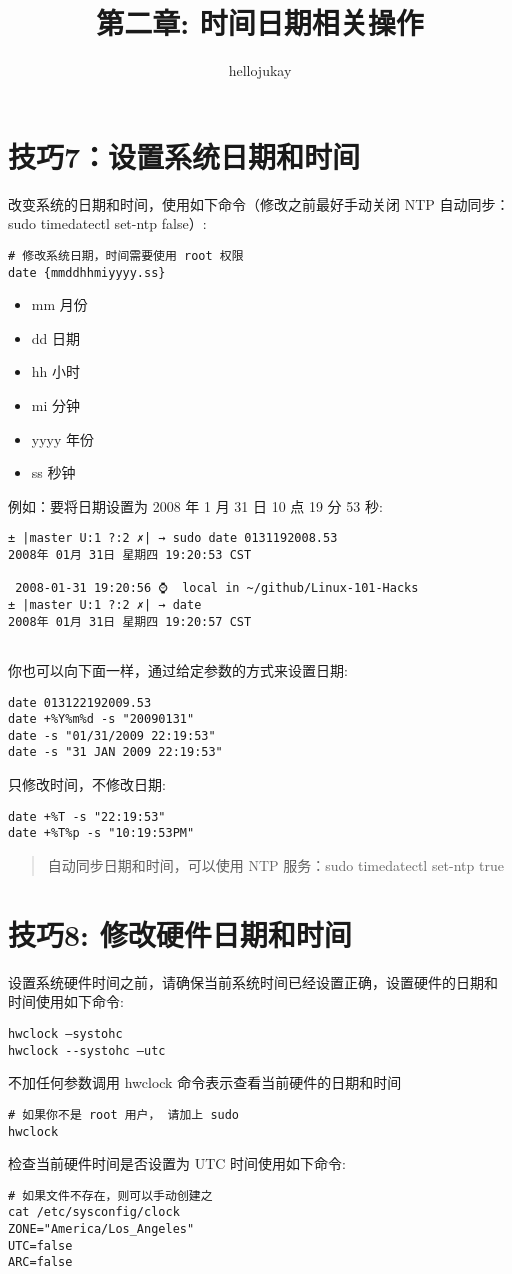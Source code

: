 \documentclass[UTF8]{ctexart}
\title{第二章: 时间日期相关操作}
\author{hellojukay}
\begin{document}
\section*{技巧7：设置系统日期和时间}

改变系统的日期和时间，使用如下命令（修改之前最好手动关闭 NTP 自动同步：sudo timedatectl set-ntp false）:
\begin{lstlisting}
# 修改系统日期，时间需要使用 root 权限
date {mmddhhmiyyyy.ss}
\end{lstlisting}
\begin{itemize}
    \item mm 月份
    \item dd 日期
    \item hh 小时
    \item mi 分钟
    \item yyyy 年份
    \item ss 秒钟
\end{itemize}
例如：要将日期设置为 2008 年 1 月 31 日 10 点
19 分 53 秒:
\begin{lstlisting}
± |master U:1 ?:2 ✗| → sudo date 0131192008.53                                                                                                                               
2008年 01月 31日 星期四 19:20:53 CST

 2008-01-31 19:20:56 ⌚  local in ~/github/Linux-101-Hacks
± |master U:1 ?:2 ✗| → date
2008年 01月 31日 星期四 19:20:57 CST
    
\end{lstlisting}
你也可以向下面一样，通过给定参数的方式来设置日期:
\begin{lstlisting}
date 013122192009.53
date +%Y%m%d -s "20090131"
date -s "01/31/2009 22:19:53"
date -s "31 JAN 2009 22:19:53"
\end{lstlisting}
只修改时间，不修改日期:
\begin{lstlisting}
date +%T -s "22:19:53"
date +%T%p -s "10:19:53PM"
\end{lstlisting}

\begin{quote}
    \small{自动同步日期和时间，可以使用 NTP 服务：sudo timedatectl set-ntp true}
\end{quote}


\section*{技巧8: 修改硬件日期和时间}

设置系统硬件时间之前，请确保当前系统时间已经设置正确，设置硬件的日期和
时间使用如下命令:
\begin{lstlisting}
hwclock –systohc
hwclock --systohc –utc
\end{lstlisting}
不加任何参数调用 hwclock 命令表示查看当前硬件的日期和时间
\begin{lstlisting}
# 如果你不是 root 用户， 请加上 sudo 
hwclock
\end{lstlisting}
检查当前硬件时间是否设置为 UTC 时间使用如下命令:
\begin{lstlisting}
# 如果文件不存在，则可以手动创建之
cat /etc/sysconfig/clock
ZONE="America/Los_Angeles"
UTC=false
ARC=false
\end{lstlisting}
\end{document}

